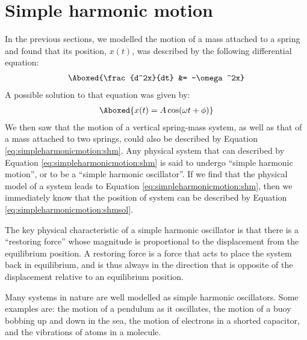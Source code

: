 \section{Simple harmonic motion}
In the previous sections, we modelled the motion of a mass attached to a spring and found that its position, $x(t)$, was described by the following differential equation:
\begin{align}
\label{eq:simpleharmonicmotion:shm}
\Aboxed{\frac{d^2x}{dt} &= -\omega^2x}
\end{align}
A possible solution to that equation was given by:
\begin{align}
\label{eq:simpleharmonicmotion:shmsol}
\Aboxed{x(t) = A\cos(\omega t+ \phi)}
\end{align}
We then saw that the motion of a vertical spring-mass system, as well as that of a mass attached to two springs, could also be described by Equation \ref{eq:simpleharmonicmotion:shm}. Any physical system that can described by Equation \ref{eq:simpleharmonicmotion:shm} is said to undergo ``simple harmonic motion'', or to be a ``simple harmonic oscillator''. If we find that the physical model of a system leads to Equation \ref{eq:simpleharmonicmotion:shm}, then we immediately know that the position of system can be described by Equation \ref{eq:simpleharmonicmotion:shmsol}.

The key physical characteristic of a simple harmonic oscillator is that there is a ``restoring force'' whose magnitude is proportional to the displacement from the equilibrium position. A restoring force is a force that acts to place the system back in equilibrium, and is thus always in the direction that is opposite of the displacement relative to an equilibrium position.

Many systems in nature are well modelled as simple harmonic oscillators. Some examples are: the motion of a pendulum as it oscillates, the motion of a buoy bobbing up and down in the sea, the motion of electrons in a shorted capacitor, and the vibrations of atoms in a molecule.

